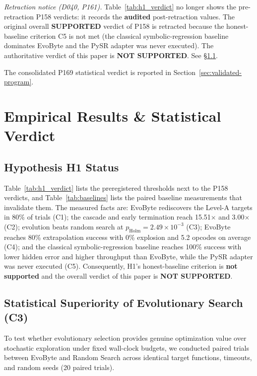 \documentclass[11pt,a4paper]{article}
\begin{document}


\noindent\emph{Retraction notice (D040, P161).} Table~\ref{tab:h1_verdict} no longer shows the
pre-retraction P158 verdicts: it records the \textbf{audited} post-retraction values. The
original overall \textbf{SUPPORTED} verdict of P158 is retracted because the honest-baseline
criterion C5 is not met (the classical symbolic-regression baseline dominates EvoByte and the
PySR adapter was never executed). The authoritative verdict of this paper is
\textbf{NOT SUPPORTED}. See \S\ref{sec:h1-status}.

\noindent The consolidated P169 statistical verdict is reported in
Section~\ref{sec:validated-program}.

\section{Empirical Results \& Statistical Verdict}

\subsection{Hypothesis H1 Status}
\label{sec:h1-status}
Table~\ref{tab:h1_verdict} lists the preregistered thresholds next to the P158 verdicts, and
Table~\ref{tab:baselines} lists the paired baseline measurements that invalidate them. The
measured facts are: EvoByte rediscovers the Level-A targets in 80\% of trials (C1); the cascade
and early termination reach 15.51$\times$ and 3.00$\times$ (C2); evolution beats random search
at $p_{\text{Holm}} = 2.49 \times 10^{-3}$ (C3); EvoByte reaches 80\% extrapolation success with
0\% explosion and 5.2 opcodes on average (C4); and the classical symbolic-regression baseline
reaches 100\% success with lower hidden error and higher throughput than EvoByte, while the PySR
adapter was never executed (C5). Consequently, H1's honest-baseline criterion is
\textbf{not supported} and the overall verdict of this paper is \textbf{NOT SUPPORTED}.

\subsection{Statistical Superiority of Evolutionary Search (C3)}
To test whether evolutionary selection provides genuine optimization value over stochastic exploration under fixed wall-clock budgets, we conducted paired trials between EvoByte and Random Search across identical target functions, timeouts, and random seeds (20 paired trials).
\end{document}
